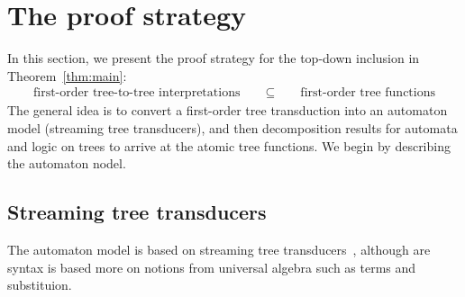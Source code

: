 \section{The proof strategy}
\label{sec:strategy}
In this section, we present the proof strategy for the top-down inclusion in Theorem~\ref{thm:main}:
\begin{align*}
    \text{first-order tree-to-tree interpretations} \qquad \subseteq \qquad \text{first-order tree functions}
\end{align*}
The general idea is to convert a first-order tree transduction into an automaton model (streaming tree transducers), and then decomposition results for automata and logic on trees to arrive at the atomic tree functions. We begin by describing the automaton nodel. 

\subsection{Streaming tree transducers}
The automaton model is based on streaming tree transducers~\cite{alur2017streaming}, although are syntax is based more on notions from universal algebra such as terms and substituion.





